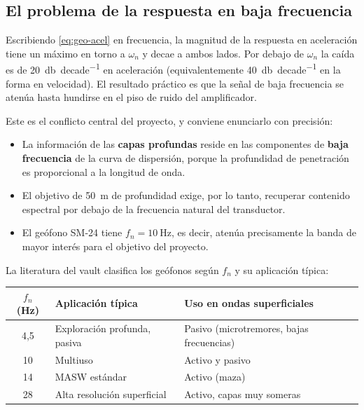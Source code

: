 \subsection{El problema de la respuesta en baja frecuencia}

Escribiendo \eqref{eq:geo-acel} en frecuencia, la magnitud de la respuesta en aceleraci\'on
tiene un m\'aximo en torno a $\omega_n$ y decae a ambos lados. Por debajo de $\omega_n$ la
ca\'ida es de \SI{20}{\decibel\per decade} en aceleraci\'on (equivalentemente
\SI{40}{\decibel\per decade} en la forma en velocidad). El resultado pr\'actico es que
la se\~nal de baja frecuencia se atenúa hasta hundirse en el piso de ruido del
amplificador.

Este es el conflicto central del proyecto, y conviene enunciarlo con precisi\'on:

\begin{itemize}[itemsep=0.15em]
    \item La informaci\'on de las \textbf{capas profundas} reside en las componentes de
    \textbf{baja frecuencia} de la curva de dispersi\'on, porque la profundidad de
    penetraci\'on es proporcional a la longitud de onda.
    \item El objetivo de \SI{50}{\meter} de profundidad exige, por lo tanto, recuperar
    contenido espectral por debajo de la frecuencia natural del transductor.
    \item El ge\'ofono SM-24 tiene $f_n=\SI{10}{\hertz}$, es decir, atenúa precisamente
    la banda de mayor inter\'es para el objetivo del proyecto.
\end{itemize}

La literatura del vault clasifica los ge\'ofonos seg\'un $f_n$ y su aplicaci\'on t\'ipica:

\begin{center}\footnotesize
\begin{tabular}{@{}cll@{}}
\toprule
$f_n$ (\si{\hertz}) & Aplicaci\'on t\'ipica & Uso en ondas superficiales \\
\midrule
4{,}5 & Exploraci\'on profunda, pasiva & Pasivo (microtremores, bajas frecuencias) \\
10   & Multiuso & Activo y pasivo \\
14   & MASW est\'andar & Activo (maza) \\
28   & Alta resoluci\'on superficial & Activo, capas muy someras \\
\bottomrule
\end{tabular}
\end{center}

